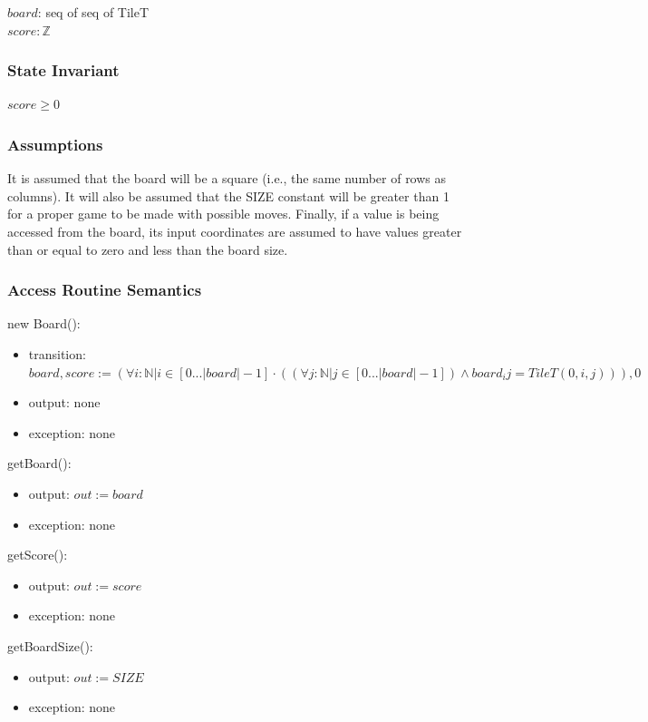 \documentclass[12pt]{article}
\begin{document}
$\mathit{board}$: seq of seq of TileT\\
$\mathit{score}: \mathbb{Z}$

\subsubsection* {State Invariant}

$score \ge 0$

\subsubsection* {Assumptions}

It is assumed that the board will be a square (i.e., the same number of rows as columns). It will also be assumed that the SIZE constant will be greater than 1 for a proper game to be made with possible moves. Finally, if a value is being accessed from the board, its input coordinates are assumed to have values greater than or equal to zero and less than the board size.

\subsubsection* {Access Routine Semantics}

\noindent new Board():
\begin{itemize}
\item transition: $\mathit{board}, \mathit{score} := (\forall i: \mathbb{N} \vert i \in [0...|board| - 1] \cdot ((\forall j: \mathbb{N} \vert j \in [0...|board| - 1]) \land board_ij = TileT(0, i, j))), 0$
\item output: none
\item exception: none
\end{itemize}

\noindent getBoard():
\begin{itemize}
\item output: $out := \mathit{board}$
\item exception: none
\end{itemize}

\noindent getScore():
\begin{itemize}
\item output: $out := \mathit{score}$
\item exception: none
\end{itemize}

\noindent getBoardSize():
\begin{itemize}
\item output: $out := \mathit{SIZE}$
\item exception: none
\end{itemize}
\end{document}
